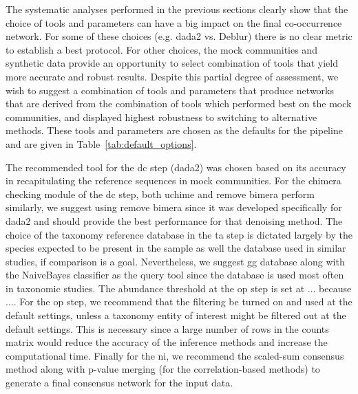   The systematic analyses performed in the previous sections clearly show that the choice of tools and parameters can have a big impact on the final co-occurrence network.
  For some of these choices (e.g. \ac{dada2} vs. Deblur) there is no clear metric to establish a best protocol.
  For other choices, the mock communities and synthetic data provide an opportunity to select combination of tools that yield more accurate and robust results.
  Despite this partial degree of assessment, we wish to suggest a combination of tools and parameters that produce networks that are derived from the combination of tools which performed best on the mock communities, and displayed highest robustness to switching to alternative methods.
  These tools and parameters are chosen as the defaults for the pipeline and are given in Table~\ref{tab:default_options}.

  The recommended tool for the \ac{dc} step (\ac{dada2}) was chosen based on its accuracy in recapitulating the reference sequences in mock communities.
  For the chimera checking module of the \ac{dc} step, both uchime and remove bimera perform similarly, we suggest using remove bimera since it was developed specifically for \ac{dada2} and should provide the best performance for that denoising method.
  The choice of the taxonomy reference database in the \ac{ta} step is dictated largely by the species expected to be present in the sample as well the database used in similar studies, if comparison is a goal.
  Nevertheless, we suggest \ac{gg} database along with the NaiveBayes classifier as the query tool since the database is used most often in taxonomic studies.
  The abundance threshold at the \ac{op} step is set at ... because ....
  For the \ac{op} step, we recommend that the filtering be turned on and used at the default settings, unless a taxonomy entity of interest might be filtered out at the default settings.
  This is necessary since a large number of rows in the counts matrix would reduce the accuracy of the inference methods and increase the computational time.
  Finally for the \ac{ni}, we recommend the scaled-sum consensus method along with p-value merging (for the correlation-based methods) to generate a final consensus network for the input data.

